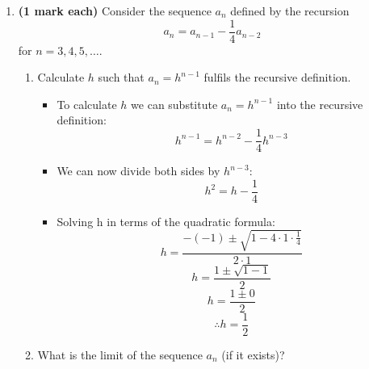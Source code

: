 \documentclass[12pt]{report}
\begin{document}
\begin{enumerate}[leftmargin=\labelsep]
    \item {\bf (1 mark each)} Consider the sequence $a_n$ defined by the recursion
        \begin{equation}
            a_n=a_{n-1}-\frac{1}{4}a_{n-2}
        \end{equation} for $n=3,4,5,\dots$.
        \begin{enumerate}
            \item Calculate $h$ such that $a_n=h^{n-1}$ fulfils the recursive definition.
                \begin{tcolorbox}
                    \begin{itemize}[label={}]
                        \item To calculate $h$ we can substitute $a_n=h^{n-1}$ into the recursive definition:
                        \begin{equation*}
                            h^{n-1}=h^{n-2}-\frac{1}{4}h^{n-3}
                        \end{equation*}
                        \item We can now divide both sides by $h^{n-3}$:
                        \begin{equation*}
                            h^2=h- \frac{1}{4}
                        \end{equation*}
                        \item Solving h in terms of the quadratic formula:
                        \begin{equation*}
                            h=\frac{-(-1) \pm \sqrt{1-4 \cdot 1 \cdot \frac{1}{4}}}{2 \cdot 1}
                        \end{equation*}
                        \begin{equation*}
                            h=\frac{1 \pm \sqrt{1-1}}{2}
                        \end{equation*}
                        \begin{equation*}
                            h=\frac{1 \pm 0}{2}
                        \end{equation*}
                        \begin{equation*}
                            \therefore h=\frac{1}{2}
                        \end{equation*}
                    \end{itemize}
                \end{tcolorbox}
\newpage 
            \item What is the limit of the sequence $a_n$ (if it exists)?

\end{enumerate}
\end{enumerate}
\end{document}
